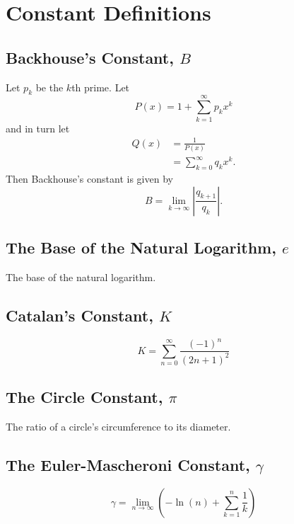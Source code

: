 \documentclass[12pt]{article}
\begin{document}
\section*{Constant Definitions}

\subsection{Backhouse's Constant, $B$}
Let $p_{k}$ be the $k$th prime. Let
\begin{equation*}
P(x) = 1 + \sum_{k = 1}^{\infty} p_{k}x^{k}
\end{equation*}
and in turn let
\begin{align*}
Q(x) &= \frac{1}{P(x)}\\
&= \sum_{k = 0}^{\infty} q_{k}x^{k}.
\end{align*}
Then Backhouse's constant is given by
\begin{equation*}
B = \lim_{k \rightarrow \infty} \left| \frac{q_{k + 1}}{q_{k}} \right|.
\end{equation*}

\subsection{The Base of the Natural Logarithm, $e$}
The base of the natural logarithm.

\subsection{Catalan's Constant, $K$}
\begin{equation*}
K = \sum_{n = 0}^{\infty} \frac{(-1)^{n}}{(2n + 1)^{2}}
\end{equation*}

\subsection{The Circle Constant, $\pi$}
The ratio of a circle's circumference to its diameter.

\subsection{The Euler-Mascheroni Constant, $\gamma$}
\begin{equation*}
\gamma = \lim_{n \rightarrow \infty} \left( -\ln(n) + \sum_{k = 1}^{n} \frac{1}{k} \right)
\end{equation*}
\end{document}
